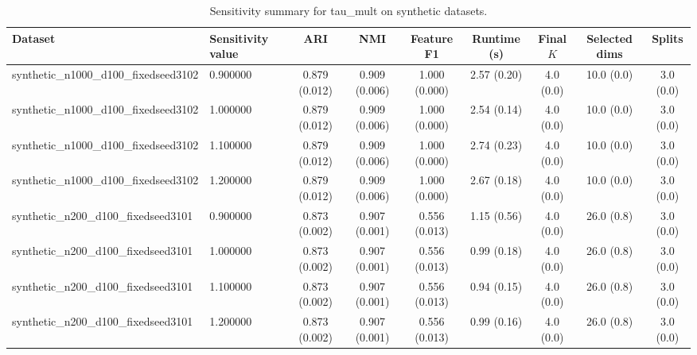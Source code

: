 \begin{table}[t]
\centering
\caption{Sensitivity summary for tau_mult on synthetic datasets.}
\label{tab:sens-tau_mult-synthetic}
\begin{tabular}{llccccccc}
\toprule
Dataset & Sensitivity value & ARI & NMI & Feature F1 & Runtime (s) & Final $K$ & Selected dims & Splits \\
\midrule
synthetic_n1000_d100_fixedseed3102 & 0.900000 & 0.879 (0.012) & 0.909 (0.006) & 1.000 (0.000) & 2.57 (0.20) & 4.0 (0.0) & 10.0 (0.0) & 3.0 (0.0) \\
synthetic_n1000_d100_fixedseed3102 & 1.000000 & 0.879 (0.012) & 0.909 (0.006) & 1.000 (0.000) & 2.54 (0.14) & 4.0 (0.0) & 10.0 (0.0) & 3.0 (0.0) \\
synthetic_n1000_d100_fixedseed3102 & 1.100000 & 0.879 (0.012) & 0.909 (0.006) & 1.000 (0.000) & 2.74 (0.23) & 4.0 (0.0) & 10.0 (0.0) & 3.0 (0.0) \\
synthetic_n1000_d100_fixedseed3102 & 1.200000 & 0.879 (0.012) & 0.909 (0.006) & 1.000 (0.000) & 2.67 (0.18) & 4.0 (0.0) & 10.0 (0.0) & 3.0 (0.0) \\
synthetic_n200_d100_fixedseed3101 & 0.900000 & 0.873 (0.002) & 0.907 (0.001) & 0.556 (0.013) & 1.15 (0.56) & 4.0 (0.0) & 26.0 (0.8) & 3.0 (0.0) \\
synthetic_n200_d100_fixedseed3101 & 1.000000 & 0.873 (0.002) & 0.907 (0.001) & 0.556 (0.013) & 0.99 (0.18) & 4.0 (0.0) & 26.0 (0.8) & 3.0 (0.0) \\
synthetic_n200_d100_fixedseed3101 & 1.100000 & 0.873 (0.002) & 0.907 (0.001) & 0.556 (0.013) & 0.94 (0.15) & 4.0 (0.0) & 26.0 (0.8) & 3.0 (0.0) \\
synthetic_n200_d100_fixedseed3101 & 1.200000 & 0.873 (0.002) & 0.907 (0.001) & 0.556 (0.013) & 0.99 (0.16) & 4.0 (0.0) & 26.0 (0.8) & 3.0 (0.0) \\
\bottomrule
\end{tabular}
\end{table}
